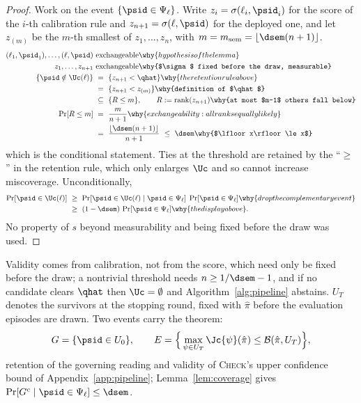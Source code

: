 \begin{proof}
Work on the event $\{\psid\in\Psi_\ell\}$. Write $z_i=\sigma(\ell_i,\psid_i)$
for the score of the $i$-th calibration rule and $z_{n+1}=\sigma(\ell,\psid)$
for the deployed one, and let $z_{(m)}$ be the $m$-th smallest of
$z_1,\dots,z_n$, with $m=m_{\mathrm{sem}}=\lfloor\dsem(n+1)\rfloor$.
\begin{align*}
(\ell_1,\psid_1),\dots,(\ell,\psid)\ &\text{exchangeable}
   \why{hypothesis of the lemma}\\
z_1,\dots,z_{n+1}\ &\text{exchangeable}
   \why{$\sigma$ fixed before the draw, measurable}\\
\{\psid\notin\Uc(\ell)\}\ &=\ \{z_{n+1}<\qhat\}
   \why{the retention rule above}\\
   &=\ \{z_{n+1}<z_{(m)}\}
   \why{definition of $\qhat$}\\
   &\subseteq\ \{R\le m\},\qquad R:=\operatorname{rank}(z_{n+1})
   \why{at most $m-1$ others fall below}\\
\Pr[R\le m]\ &=\ \frac{m}{n+1}
   \why{exchangeability: all ranks equally likely}\\
   &=\ \frac{\lfloor\dsem(n+1)\rfloor}{n+1}\ \le\ \dsem
   \why{$\lfloor x\rfloor\le x$}
\end{align*}
which is the conditional statement. Ties at the threshold are retained by
the ``$\ge$'' in the retention rule, which only enlarges $\Uc$ and so
cannot increase miscoverage. Unconditionally,
\begin{align*}
\Pr[\psid\in\Uc(\ell)]\
 &\ge\ \Pr[\psid\in\Uc(\ell)\mid\psid\in\Psi_\ell]\;\Pr[\psid\in\Psi_\ell]
 \why{drop the complementary event}\\
 &\ge\ (1-\dsem)\,\Pr[\psid\in\Psi_\ell]
 \why{the display above}.
\end{align*}
No property of $s$ beyond measurability and being fixed before the draw was
used.
\end{proof}

\noindent Validity comes from calibration, not from the score, which need only be fixed before
the draw; a nontrivial threshold needs $n\ge1/\dsem-1$, and if no candidate clears $\qhat$ then
$\Uc=\emptyset$ and Algorithm~\ref{alg:pipeline} abstains. $U_T$ denotes the survivors at the
stopping round, fixed with $\hat\pi$ before the evaluation episodes are drawn. Two events carry
the theorem:
\[
G=\{\psid\in U_0\},
\qquad
E=\Big\{\max_{\psi\in U_T}\Jc{\psi}(\hat\pi)\le\mathcal B(\hat\pi,U_T)\Big\},
\]
retention of the governing reading and validity of \textsc{Check}'s upper confidence bound
of Appendix~\ref{app:pipeline}; Lemma~\ref{lem:coverage} gives
$\Pr[G^c\mid\psid\in\Psi_\ell]\le\dsem$.

